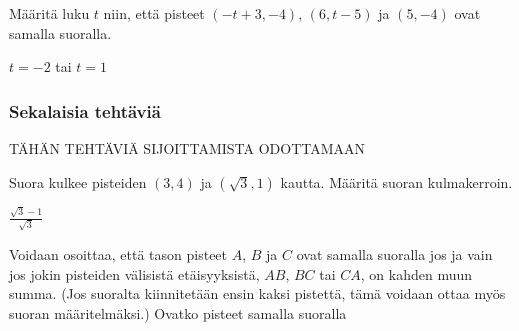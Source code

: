 \begin{tehtavasivu}
\begin{tehtava}
Määritä luku $t$ niin, että pisteet $(-t+3, -4)$, $(6, t-5)$ ja $(5, -4)$ ovat samalla suoralla.
\begin{vastaus}
$t=-2$ tai $t=1$
\end{vastaus}
\end{tehtava}

\subsubsection*{Sekalaisia tehtäviä}

TÄHÄN TEHTÄVIÄ SIJOITTAMISTA ODOTTAMAAN

\begin {tehtava}
Suora kulkee pisteiden $(3, 4)$ ja $(\sqrt{3}, 1)$ kautta. Määritä suoran kulmakerroin.
\begin {vastaus}
$\frac{\sqrt{3}-1}{\sqrt{3}}$
\end {vastaus}
\end {tehtava}

\begin{tehtava}
Voidaan osoittaa, että tason pisteet $A$, $B$ ja $C$ ovat samalla suoralla jos ja vain jos jokin pisteiden välisistä etäisyyksistä, $AB$, $BC$ tai $CA$, on kahden muun summa. (Jos suoralta kiinnitetään ensin kaksi pistettä, tämä voidaan ottaa myös suoran määritelmäksi.) Ovatko pisteet samalla suoralla
	\begin{alakohdat}
	\end{alakohdat}
	\begin{vastaus}
		\begin{alakohdat}
			\alakohta{Eivät}
			\alakohta{Ovat}
		\end{alakohdat}
	\end{vastaus}
\end{tehtava}

\end{tehtavasivu}

